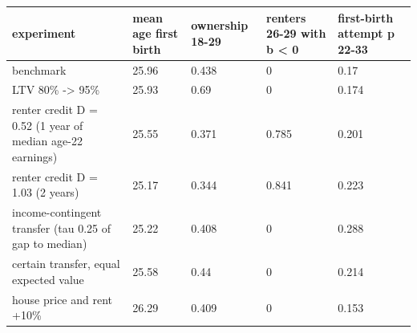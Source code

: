 \begingroup\small
\setlength{\tabcolsep}{3pt}
\renewcommand{\arraystretch}{1.04}
\begin{tabularx}{\linewidth}{XXXXX}
\toprule
experiment & mean age first birth & ownership 18-29 & renters 26-29 with b \textless{} 0 & first-birth attempt p 22-33 \\
\midrule
benchmark & 25.96 & 0.438 & 0 & 0.17 \\
LTV 80\% -\textgreater{} 95\% & 25.93 & 0.69 & 0 & 0.174 \\
renter credit D = 0.52 (1 year of median age-22 earnings) & 25.55 & 0.371 & 0.785 & 0.201 \\
renter credit D = 1.03 (2 years) & 25.17 & 0.344 & 0.841 & 0.223 \\
income-contingent transfer (tau 0.25 of gap to median) & 25.22 & 0.408 & 0 & 0.288 \\
certain transfer, equal expected value & 25.58 & 0.44 & 0 & 0.214 \\
house price and rent +10\% & 26.29 & 0.409 & 0 & 0.153 \\
\bottomrule
\end{tabularx}
\endgroup
